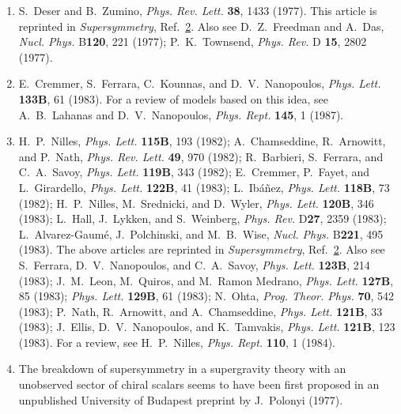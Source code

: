 \begin{enumerate}
  \item {}\label{ch31-ref-13}
  S.~Deser and B.~Zumino, \textit{Phys. Rev. Lett.} \textbf{38}, 1433
  (1977). This article is reprinted in \textit{Supersymmetry},
  Ref.~\hyperref[ch31-ref-2]{2}. Also see D.~Z.~Freedman and A.~Das,
  \textit{Nucl. Phys.} B\textbf{120}, 221 (1977); P.~K.~Townsend,
  \textit{Phys. Rev.} D \textbf{15}, 2802 (1977).

  \item[13a.] \label{ch31-ref-13a}
  E.~Cremmer, S.~Ferrara, C.~Kounnas, and D.~V.~Nanopoulos,
  \textit{Phys. Lett.} \textbf{133B}, 61 (1983). For a review of
  models based on this idea, see A.~B.~Lahanas and D.~V.~Nanopoulos,
  \textit{Phys. Rept.} \textbf{145}, 1 (1987).

  \item {}\label{ch31-ref-14}
  H.~P.~Nilles, \textit{Phys. Lett.} \textbf{115B}, 193 (1982);
  A.~Chamseddine, R.~Arnowitt, and P.~Nath,
  \textit{Phys. Rev. Lett.} \textbf{49}, 970 (1982); R.~Barbieri,
  S.~Ferrara, and C.~A.~Savoy, \textit{Phys. Lett.} \textbf{119B},
  343 (1982); E.~Cremmer, P.~Fayet, and L.~Girardello,
  \textit{Phys. Lett.} \textbf{122B}, 41 (1983); L.~Ib\'a\~nez,
  \textit{Phys. Lett.} \textbf{118B}, 73 (1982); H.~P.~Nilles,
  M.~Srednicki, and D.~Wyler, \textit{Phys. Lett.} \textbf{120B}, 346
  (1983); L.~Hall, J.~Lykken, and S.~Weinberg, \textit{Phys. Rev.}
  D\textbf{27}, 2359 (1983); L.~Alvarez-Gaum\'e, J.~Polchinski, and
  M.~B.~Wise, \textit{Nucl. Phys.} B\textbf{221}, 495 (1983). The
  above articles are reprinted in \textit{Supersymmetry},
  Ref.~\hyperref[ch31-ref-2]{2}. Also see S.~Ferrara,
  D.~V.~Nanopoulos, and C.~A.~Savoy, \textit{Phys. Lett.}
  \textbf{123B}, 214 (1983); J.~M.~Leon, M.~Quiros, and
  M.~Ramon Medrano, \textit{Phys. Lett.} \textbf{127B}, 85 (1983);
  \textit{Phys. Lett.} \textbf{129B}, 61 (1983); N.~Ohta,
  \textit{Prog. Theor. Phys.} \textbf{70}, 542 (1983); P.~Nath,
  R.~Arnowitt, and A.~Chamseddine, \textit{Phys. Lett.} \textbf{121B},
  33 (1983); J.~Ellis, D.~V.~Nanopoulos, and K.~Tamvakis,
  \textit{Phys. Lett.} \textbf{121B}, 123 (1983). For a review, see
  H.~P.~Nilles, \textit{Phys. Rept.} \textbf{110}, 1 (1984).

  \item {}\label{ch31-ref-15}
  The breakdown of supersymmetry in a supergravity theory with an
  unobserved sector of chiral scalars seems to have been first proposed
  in an unpublished University of Budapest preprint by J.~Polonyi
  (1977).


\end{enumerate}

